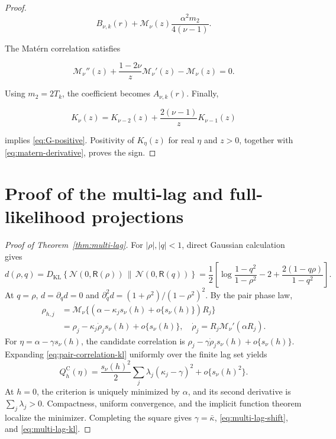 \documentclass[11pt]{article}
\theoremstyle{remark}
\newcommand{\Matern}{\mathcal M}
\newcommand{\KL}{D_{\mathrm{KL}}}
\newcommand{\Normal}{\mathcal N}
\begin{document}
\begin{proof}
\begin{equation}
  B_{\nu,k}(r)
  +\Matern_\nu(z)\frac{\alpha^2m_2}{4(\nu-1)}.
\end{equation}

The Mat\'ern correlation satisfies

\begin{equation}
  \Matern_\nu''(z)
  +\frac{1-2\nu}{z}\Matern_\nu'(z)
  -\Matern_\nu(z)=0.
\end{equation}

Using \(m_2=2T_k\), the coefficient becomes
\(A_{\nu,k}(r)\).  Finally,

\begin{equation}
  K_\nu(z)=K_{\nu-2}(z)+\frac{2(\nu-1)}{z}K_{\nu-1}(z)
\end{equation}

implies \eqref{eq:G-positive}.  Positivity of \(K_\eta(z)\) for real \(\eta\)
and \(z>0\), together with \eqref{eq:matern-derivative}, proves the sign.
\end{proof}

\section{Proof of the multi-lag and full-likelihood projections}

\begin{proof}[Proof of Theorem~\ref{thm:multi-lag}]
For \(|\rho|,|q|<1\), direct Gaussian calculation gives
\begin{equation}
 d(\rho,q)=\KL\!\left\{\Normal(0,\mathsf R(\rho))\,\middle\|\,
 \Normal(0,\mathsf R(q))\right\}
 =\frac12\left[
 \log\frac{1-q^2}{1-\rho^2}-2+
 \frac{2(1-q\rho)}{1-q^2}\right].
 \label{eq:pair-correlation-kl}
\end{equation}
At \(q=\rho\), \(d=\partial_qd=0\) and
\(\partial_q^2d=(1+\rho^2)/(1-\rho^2)^2\). By the pair phase law,
\begin{align*}
 \rho_{h,j}
 &=\Matern_\nu\{(\alpha-\kappa_j s_\nu(h)+o\{s_\nu(h)\})R_j\}\\
 &=\rho_j-\kappa_j\dot\rho_j s_\nu(h)+o\{s_\nu(h)\},
 \quad \dot\rho_j=R_j\Matern_\nu'(\alpha R_j).
\end{align*}
For \(\eta=\alpha-\gamma s_\nu(h)\), the candidate correlation is
\(\rho_j-\gamma\dot\rho_j s_\nu(h)+o\{s_\nu(h)\}\). Expanding
\eqref{eq:pair-correlation-kl} uniformly over the finite lag set yields
\begin{equation}
 Q_h^{\mathrm C}(\eta)=\frac{s_\nu(h)^2}{2}
 \sum_j\lambda_j(\kappa_j-\gamma)^2+o\{s_\nu(h)^2\}.
\end{equation}
At \(h=0\), the criterion is uniquely minimized by \(\alpha\), and its
second derivative is \(\sum_j\lambda_j>0\). Compactness, uniform convergence,
and the implicit function theorem localize the minimizer. Completing the square
gives \(\gamma=\bar\kappa\), \eqref{eq:multi-lag-shift}, and
\eqref{eq:multi-lag-kl}.
\end{proof}
\end{document}
